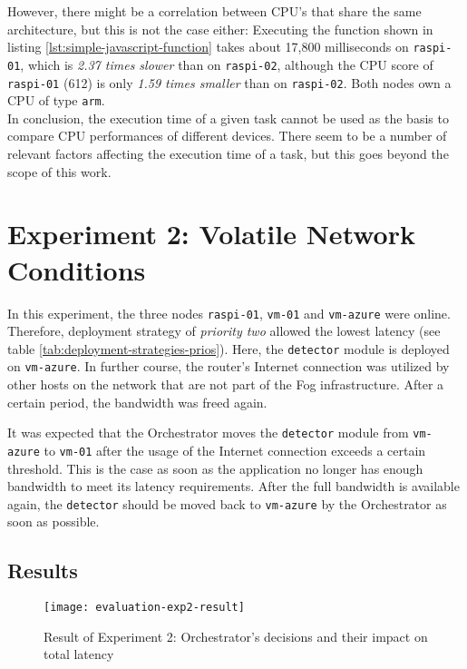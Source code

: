 However, there might be a correlation between CPU's that share the same architecture, but this is not the case either:
Executing the function shown in listing \ref{lst:simple-javascript-function} takes about 17,800 milliseconds on \texttt{raspi-01}, which is \textit{2.37 times slower} than on \texttt{raspi-02}, although the CPU score of \texttt{raspi-01} (612) is only \textit{1.59 times smaller} than on \texttt{raspi-02}. Both nodes own a CPU of type \texttt{arm}.\\

In conclusion, the execution time of a given task cannot be used as the basis to compare CPU performances of different devices.
There seem to be a number of relevant factors affecting the execution time of a task, but this goes beyond the scope of this work.




\section{Experiment 2: Volatile Network Conditions}

In this experiment, the three nodes \texttt{raspi-01}, \texttt{vm-01} and \texttt{vm-azure} were online. Therefore, deployment strategy of \textit{priority two} allowed the lowest latency (see table \ref{tab:deployment-strategies-prios}).
Here, the \texttt{detector} module is deployed on \texttt{vm-azure}.
In further course, the router's Internet connection was utilized by other hosts on the network that are not part of the Fog infrastructure.
After a certain period, the bandwidth was freed again.


It was expected that the Orchestrator moves the \texttt{detector} module from \texttt{vm-azure} to \texttt{vm-01} after the usage of the Internet connection exceeds a certain threshold.
This is the case as soon as the application no longer has enough bandwidth to meet its latency requirements.
After the full bandwidth is available again, the \texttt{detector} should be moved back to \texttt{vm-azure} by the Orchestrator as soon as possible.


\subsection*{Results}

\begin{figure}[htb]
    \centering
    \texttt{[image: evaluation-exp2-result]}
    \caption{Result of Experiment 2: Orchestrator's decisions and their impact on total latency}
    \label{fig:evaluation-exp2-results}
\end{figure}

